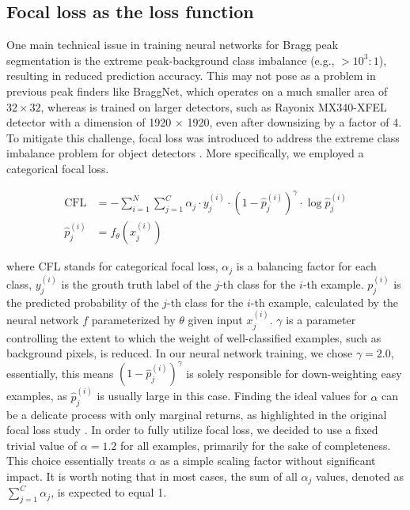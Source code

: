 \documentclass[a4paper]{article}
\begin{document}
\subsection{Focal loss as the loss function}

One main technical issue in training neural networks for Bragg peak segmentation is the extreme peak-background class imbalance (e.g., $> 10^3 : 1$), resulting in reduced prediction accuracy.  This may not pose as a problem in previous peak finders like BraggNet, which operates on a much smaller area of $32 \times 32$, whereas \peaknet{} is trained on larger detectors, such as Rayonix MX340-XFEL detector with a dimension of 1920 $\times$ 1920, even after downsizing by a factor of 4.  To mitigate this challenge, focal loss was introduced to address the extreme class imbalance problem for object detectors \citep{linFocalLossDense2018}.  More specifically, we employed a categorical focal loss.

\begin{align}
\text{CFL} &= - \sum_{i = 1}^{N}\sum_{j = 1}^{C} 
            \alpha_j \cdot y_j^{(i)} \cdot (1-\hat{p}_j^{(i)})^\gamma 
            \cdot \log{\hat{p}_j^{(i)}} \\
\hat{p}_j^{(i)} &= f_\theta(x_j^{(i)})
\end{align}

where CFL stands for categorical focal loss, $\alpha_j$ is a balancing factor for each class, $y_j^{(i)}$ is the grouth truth label of the $j$-th class for the $i$-th example.  $p_j^{(i)}$ is the predicted probability of the $j$-th class for the $i$-th example, calculated by the neural network $f$ parameterized by $\theta$ given input $x_j^{(i)}$.  $\gamma$ is a parameter controlling the extent to which the weight of well-classified examples, such as background pixels, is reduced.  In our neural network training, we chose $\gamma = 2.0$, essentially, this means $(1-\hat{p} _j^{(i)}) ^\gamma$ is solely responsible for down-weighting easy examples, as $\hat{p} _j^{(i)}$ is usually large in this case.  Finding the ideal values for $\alpha$ can be a delicate process with only marginal returns, as highlighted in the original focal loss study \citep{linFocalLossDense2018}.  In order to fully utilize focal loss, we decided to use a fixed trivial value of $\alpha = 1.2$ for all examples, primarily for the sake of completeness.  This choice essentially treats $\alpha$ as a simple scaling factor without significant impact.  It is worth noting that in most cases, the sum of all $\alpha_j$ values, denoted as $\sum_{j = 1}^{C} \alpha_j$, is expected to equal 1.
\end{document}
